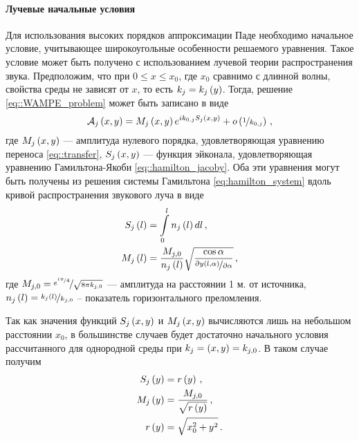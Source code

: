 \documentclass[../document.tex]{subfiles}
\begin{document}
				\paragraph{Лучевые начальные условия}\label{sec::ray_starters}
					\par Для использования высоких порядков аппроксимации Паде необходимо начальное условие, учитывающее широкоугольные особенности решаемого уравнения. Такое условие может быть получено с использованием лучевой теории распространения звука. Предположим, что при $0\leqslant x\leqslant x_0$, где $x_0$ сравнимо с длинной волны, свойства среды не зависят от $x$, то есть $k_j=k_j\left(y\right)$. Тогда, решение \eqref{eq::WAMPE_problem} может быть записано в виде
					\begin{equation}
						\mathcal{A}_j\left(x,y\right)=M_j\left(x,y\right)e^{ik_{0,j}S_j\left(x,y\right)}+o\left(\nicefrac{1}{k_{0,j}}\right)\,,
					\end{equation}
					где $M_j\left(x,y\right)$ --- амплитуда нулевого порядка, удовлетворяющая уравнению переноса \eqref{eq::transfer},
					$S_j\left(x,y\right)$ --- функция эйконала, удовлетворяющая уравнению Гамильтона-Якоби \eqref{eq::hamilton_jacoby}. 
					Оба эти уравнения могут быть получены из решения системы Гамильтона \eqref{eq:hamilton_system} вдоль кривой распространения звукового луча в виде
					\begin{align}
						S_j\left(l\right)&=\int\limits_0^ln_j\left(l\right)dl\,,\\
						M_j\left(l\right)&=\frac{M_{j,0}}{n_j\left(l\right)}\sqrt{\frac{\cos\alpha}{\nicefrac{\partial y\left(l,\alpha\right)}{\partial\alpha}}}\,,
					\end{align}
					где $M_{j,0}=\nicefrac{e^{\nicefrac{i\pi}{4}}}{\sqrt{8\pi k_{j,0}}}$ --- амплитуда на расстоянии 1 м. от источника, $n_j\left(l\right)=\nicefrac{k_j\left(l\right)}{k_{j,0}}$ -- показатель горизонтального преломления.
                    \par Так как значения функций $S_j\left(x,y\right)$ и $M_j\left(x,y\right)$ вычисляются лишь на небольшом расстоянии $x_0$, в большинстве случаев будет достаточно начального условия рассчитанного для однородной среды при $k_j=\left(x,y\right)=k_{j,0}$. В таком случае получим
                    \begin{equation}\label{eq::ray_simple}
                        \begin{aligned}
                            S_j\left(y\right)&=r\left(y\right)\,,\\
                            M_j\left(y\right)&=\frac{M_{j,0}}{\sqrt{r\left(y\right)}}\,,\\
                            r\left(y\right)&=\sqrt{x_0^2+y^2}\,.
                        \end{aligned}
                    \end{equation}
\end{document}
